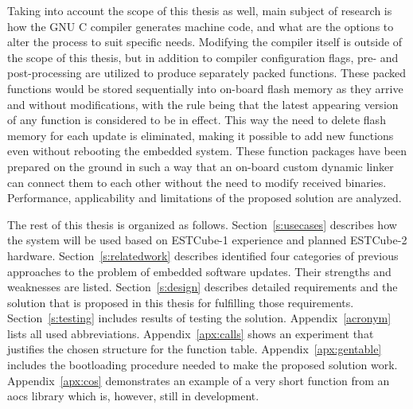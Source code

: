 Taking into account the scope of this thesis as well, main subject of research is how the GNU C compiler generates machine code, and what are the options to alter the process to suit specific needs. Modifying the compiler itself is outside of the scope of this thesis, but in addition to compiler configuration flags, pre- and post-processing are utilized to produce separately packed functions. These packed functions would be stored sequentially into on-board flash memory as they arrive and without modifications, with the rule being that the latest appearing version of any function is considered to be in effect. This way the need to delete flash memory for each update is eliminated, making it possible to add new functions even without rebooting the embedded system. These function packages have been prepared on the ground in such a way that an on-board custom dynamic linker can connect them to each other without the need to modify received binaries. Performance, applicability and limitations of the proposed solution are analyzed.

The rest of this thesis is organized as follows. Section~\ref{s:usecases} describes how the system will be used based on ESTCube-1 experience and planned ESTCube-2 hardware. Section~\ref{s:relatedwork} describes identified four categories of previous approaches to the problem of embedded software updates. Their strengths and weaknesses are listed. Section~\ref{s:design} describes detailed requirements and the solution that is proposed in this thesis for fulfilling those requirements. Section~\ref{s:testing} includes results of testing the solution. Appendix~\ref{acronym} lists all used abbreviations. Appendix~\ref{apx:calls} shows an experiment that justifies the chosen structure for the function table. Appendix~\ref{apx:gentable} includes the bootloading procedure needed to make the proposed solution work. Appendix~\ref{apx:cos} demonstrates an example of a very short function from an \gls{aocs} library which is, however, still in development.
